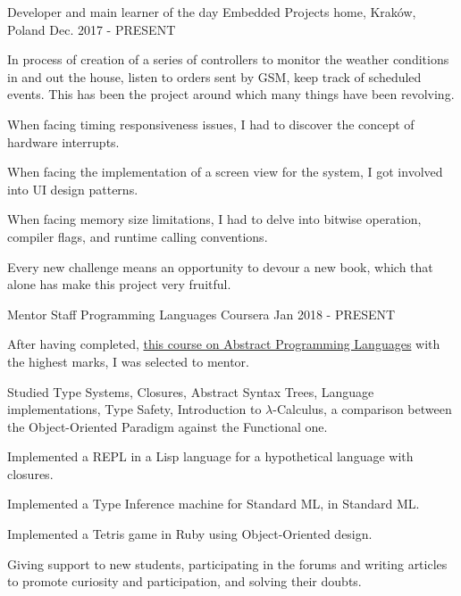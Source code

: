 

\begin{cventries}

\cventry
	{Developer and main learner of the day}
	{Embedded Projects}
	{home, Kraków, Poland}
	{Dec. 2017 - PRESENT}
	{
		\begin{cvitems} %
			\item {In process of creation of a series of controllers to monitor the weather conditions in and out the house, listen to orders sent by GSM, keep track of scheduled events. This has been the project around which many things have been revolving.}
	        \item {When facing timing responsiveness issues, I had to discover the concept of hardware interrupts.}
			\item {When facing the implementation of a screen view for the system, I got involved into UI design patterns.}
			\item {When facing memory size limitations, I had to delve into bitwise operation, compiler flags, and runtime calling conventions.}
			\item {Every new challenge means an opportunity to devour a new book, which that alone has make this project very fruitful.}
		\end{cvitems}
	}

  \cventry
    {Mentor Staff}
    {Programming Languages}
    {Coursera}
    {Jan 2018 - PRESENT}
    {
      \begin{cvitems} %
        \item {After having completed, \href{https://www.coursera.org/learn/programming-languages}{this course on Abstract Programming Languages} with the highest marks, I was selected to mentor.}
        \item {Studied Type Systems, Closures, Abstract Syntax Trees, Language implementations, Type Safety, Introduction to $\lambda$-Calculus, a comparison between the Object-Oriented Paradigm against the Functional one.}
        \item {Implemented a REPL in a Lisp language for a hypothetical language with closures.}
        \item {Implemented a Type Inference machine for Standard ML, in Standard ML.}
        \item {Implemented a Tetris game in Ruby using Object-Oriented design.}
        \item {Giving support to new students, participating in the forums and writing articles to promote curiosity and participation, and solving their doubts.}
      \end{cvitems}
    }


\end{cventries}

